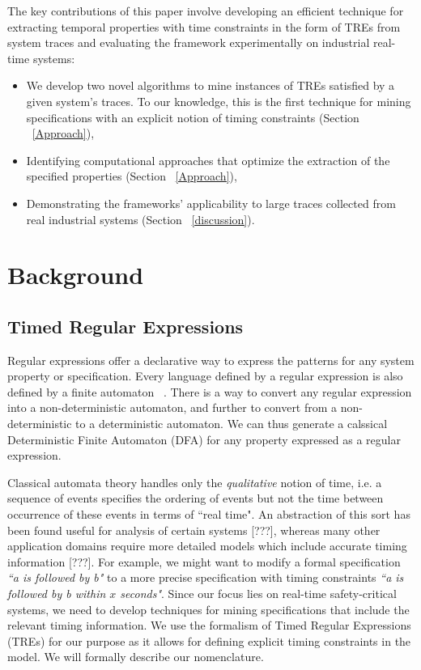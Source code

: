 \documentclass[]{sigplanconf}
\begin{document}
The key contributions of this paper involve developing an efficient technique for extracting temporal properties with time constraints in the form of TREs from system traces and evaluating the framework experimentally on industrial real-time systems:

\begin{itemize}
\item We develop two novel algorithms to mine instances of TREs satisfied by a given system's traces. To our knowledge, this is the first technique for mining specifications with an explicit notion of timing constraints (Section ~\ref{Approach}),
\item Identifying computational approaches that optimize the extraction of the specified properties (Section ~\ref{Approach}),
\item Demonstrating the frameworks' applicability to large traces collected from real industrial systems (Section ~\ref{discussion}).
\end{itemize}

\section{Background} \label{Background}

\subsection{Timed Regular Expressions}

Regular expressions offer a declarative way to express the patterns for any system property or specification. Every language defined by a regular expression is also defined by a finite automaton ~\cite{book1}. There is a way to convert any regular expression into a non-deterministic automaton, and further to convert from a non-deterministic to a deterministic automaton. We can thus generate a calssical Deterministic Finite Automaton (DFA) for any property expressed as a regular expression.


Classical automata theory handles only the \emph{qualitative} notion of time, i.e. a sequence of events specifies the ordering of events but not the time between occurrence of these events in terms of ``real time". An abstraction of this sort has been found useful for analysis of certain systems [???], whereas many other application domains require more detailed models which include accurate timing information [???]. For example, we might want to modify a formal specification \emph{``a is followed by b"} to a more precise specification with timing constraints \emph{``a is followed by b within $x$ seconds"}. Since our focus lies on real-time safety-critical systems, we need to develop techniques for mining specifications that include the relevant timing information. We use the formalism of Timed Regular Expressions (TREs) for our purpose as it allows for defining explicit timing constraints in the model. We will formally describe our nomenclature.
\end{document}
